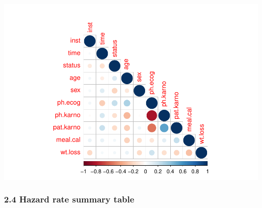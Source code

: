\documentclass[
]{article}
\begin{document}
\includegraphics{final_project_files/figure-latex/unnamed-chunk-7-1.pdf}

\hypertarget{hazard-rate-summary-table}{%
\subsubsection{2.4 Hazard rate summary
table}\label{hazard-rate-summary-table}}
\end{document}
